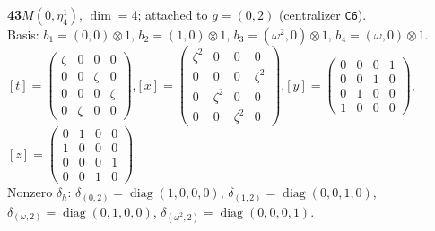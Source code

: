 \begin{samepage}\noindent\textbf{\underline{43}}\quad $M(0,\eta^{1}_{4})$, $\dim=4$; attached to $g=(0,2)$ (centralizer \texttt{C6}).\\
Basis: $b_{1}=(0,0)\otimes 1$, $b_{2}=(1,0)\otimes 1$, $b_{3}=(\omega^2,0)\otimes 1$, $b_{4}=(\omega,0)\otimes 1$.\\
$[t]=\left(\begin{smallmatrix} \zeta & 0 & 0 & 0 \\ 0 & 0 & \zeta & 0 \\ 0 & 0 & 0 & \zeta \\ 0 & \zeta & 0 & 0 \end{smallmatrix}\right)$,\quad $[x]=\left(\begin{smallmatrix} \zeta^2 & 0 & 0 & 0 \\ 0 & 0 & 0 & \zeta^2 \\ 0 & \zeta^2 & 0 & 0 \\ 0 & 0 & \zeta^2 & 0 \end{smallmatrix}\right)$,\quad $[y]=\left(\begin{smallmatrix} 0 & 0 & 0 & 1 \\ 0 & 0 & 1 & 0 \\ 0 & 1 & 0 & 0 \\ 1 & 0 & 0 & 0 \end{smallmatrix}\right)$,\quad $[z]=\left(\begin{smallmatrix} 0 & 1 & 0 & 0 \\ 1 & 0 & 0 & 0 \\ 0 & 0 & 0 & 1 \\ 0 & 0 & 1 & 0 \end{smallmatrix}\right)$.\\
Nonzero $\delta_h$: $\delta_{(0,2)}=\operatorname{diag}(1,0,0,0)$, $\delta_{(1,2)}=\operatorname{diag}(0,0,1,0)$, $\delta_{(\omega,2)}=\operatorname{diag}(0,1,0,0)$, $\delta_{(\omega^2,2)}=\operatorname{diag}(0,0,0,1)$.\end{samepage}
\medskip

